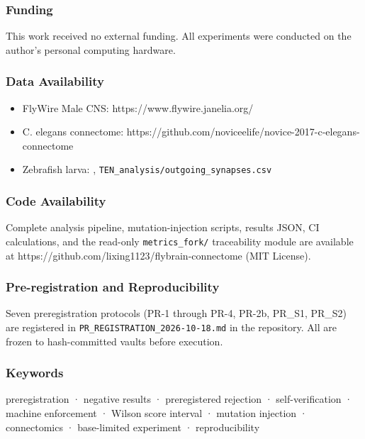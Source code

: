 \documentclass[
]{article}
\providecommand{\tightlist}{%
  \setlength{\itemsep}{0pt}\setlength{\parskip}{0pt}}
\begin{document}
\subsubsection{Funding}\label{funding}

This work received no external funding. All experiments were conducted
on the author's personal computing hardware.

\subsubsection{Data Availability}\label{data-availability}

\begin{itemize}
\tightlist
\item
  FlyWire Male CNS: https://www.flywire.janelia.org/
\item
  C. elegans connectome:
  https://github.com/noviceelife/novice-2017-c-elegans-connectome
\item
  Zebrafish larva: \citet{ref24},
  \texttt{TEN\_analysis/outgoing\_synapses.csv}
\end{itemize}

\subsubsection{Code Availability}\label{code-availability}

Complete analysis pipeline, mutation-injection scripts, results JSON, CI
calculations, and the read-only \texttt{metrics\_fork/} traceability
module are available at
https://github.com/lixing1123/flybrain-connectome (MIT License).

\subsubsection{Pre-registration and
Reproducibility}\label{pre-registration-and-reproducibility}

Seven preregistration protocols (PR-1 through PR-4, PR-2b, PR\_S1,
PR\_S2) are registered in \texttt{PR\_REGISTRATION\_2026-10-18.md} in
the repository. All are frozen to hash-committed vaults before
execution.

\subsubsection{Keywords}\label{keywords}

preregistration · negative results · preregistered rejection ·
self-verification · machine enforcement · Wilson score interval ·
mutation injection · connectomics · base-limited experiment ·
reproducibility
\end{document}
